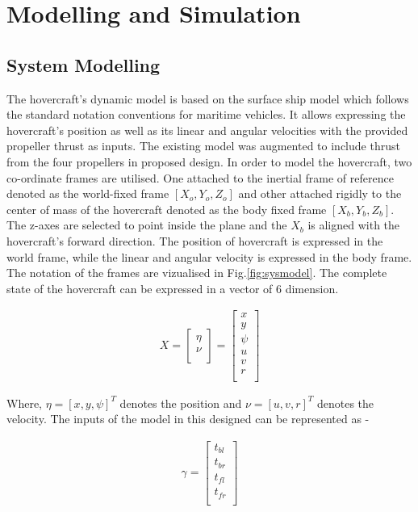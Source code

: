 \documentclass[12pt,titlepage]{article}
\begin{document}
\section{Modelling and Simulation}
\subsection{System Modelling }
The hovercraft's dynamic model is based on the surface ship model \cite{b1} which follows the standard notation conventions for maritime vehicles. It allows expressing the hovercraft's position as well as its linear and angular velocities with the provided propeller thrust as inputs. The existing model was augmented to include thrust from the four propellers in proposed design. In order to model the hovercraft, two co-ordinate frames are utilised. One attached to the inertial frame of reference denoted as the world-fixed frame $[X_o,Y_o,Z_o]$ and other attached rigidly to the center of mass of the hovercraft denoted as the body fixed frame $[X_b,Y_b,Z_b]$. The z-axes are selected to point inside the plane and the $X_b$ is aligned with the hovercraft's forward direction. The position of hovercraft is expressed in the world frame, while the linear and angular velocity is expressed in the body frame. The notation of the frames are vizualised in Fig.\ref{fig:sysmodel}. The complete state of the hovercraft can be expressed in a vector of 6 dimension. 

\begin{align}
X = 
\begin{bmatrix}
    \eta \\
    \nu \\
\end{bmatrix}
=
\begin{bmatrix}
    x \\
    y \\
    \psi \\
    u \\
    v \\
    r \\
\end{bmatrix}
\end{align}

Where, $\eta=[x,y,\psi]^T$ denotes the position and $\nu=[u,v,r]^T$ denotes the velocity. The inputs of the model in this designed can be represented as - 

\begin{align}
\gamma = 
\begin{bmatrix}
    t_{bl} \\
    t_{br} \\
    t_{fl} \\
    t_{fr} \\
\end{bmatrix}
\end{align}
\end{document}
